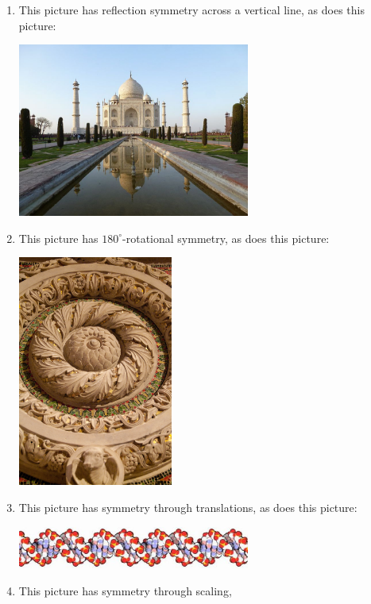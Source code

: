 \documentclass[noauthor,nooutcomes,12pt]{ximera}
\begin{document}
\begin{question}
  \begin{freeResponse}
    \begin{enumerate}
    \item This picture has reflection symmetry across a vertical line,
      as does this picture:
      \begin{center}
        \includegraphics[width=3in]{tajMahal.jpg}
      \end{center}
    \item This picture has $180^\circ$-rotational symmetry,
      as does this picture:
      \begin{center}
        \includegraphics[width=2in]{spin.jpg}
      \end{center}
    \item This picture has symmetry through translations,
      as does this picture:
      \begin{center}
        \includegraphics[width=3in]{dna.jpg}
      \end{center}
    \item This picture has symmetry through scaling,

\end{enumerate}
\end{freeResponse}
\end{question}
\end{document}
